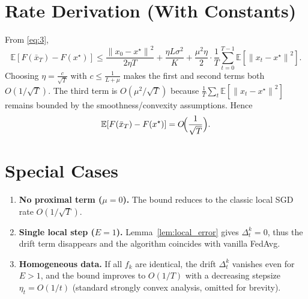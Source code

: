 \documentclass[11pt]{article}
\newcommand{\E}{\mathbb{E}}
\newcommand{\norm}[1]{\left\|#1\right\|}
\begin{document}
\section*{Rate Derivation (With Constants)}
From \eqref{eq:3},
\[
    \E[F(\bar x_T)-F(x^{\star})]
    \le \frac{\norm{x_0-x^{\star}}^{2}}{2\eta T}
         +\frac{\eta L\sigma^{2}}{K}
         +\frac{\mu^{2}\eta}{2}\cdot\frac{1}{T}\sum_{t=0}^{T-1}\E[\norm{x_t-x^{\star}}^{2}].
\]
Choosing $\eta = \frac{c}{\sqrt{T}}$ with $c\le\frac{1}{L+\mu}$ makes the first and second terms both $O(1/\sqrt{T})$.  The third term is $O(\mu^{2}/\sqrt{T})$ because $\frac1T\sum_{t}\E[\norm{x_t-x^{\star}}^{2}]$ remains bounded by the smoothness/convexity assumptions.  Hence
\[
    \E[F(\bar x_T)-F(x^{\star})]=O\!\Bigl(\frac{1}{\sqrt{T}}\Bigr).
\]

\section*{Special Cases}
\begin{enumerate}[label=\alph*)]
    \item \textbf{No proximal term ($\mu=0$).}  The bound reduces to the classic local SGD rate $O(1/\sqrt{T})$.
    \item \textbf{Single local step ($E=1$).}  Lemma~\ref{lem:local_error} gives $\Delta_{t}^{k}=0$, thus the drift term disappears and the algorithm coincides with vanilla FedAvg.
    \item \textbf{Homogeneous data.}  If all $f_k$ are identical, the drift $\Delta_{t}^{k}$ vanishes even for $E>1$, and the bound improves to $O(1/T)$ with a decreasing stepsize $\eta_t=O(1/t)$ (standard strongly convex analysis, omitted for brevity).
\end{enumerate}
\end{document}

